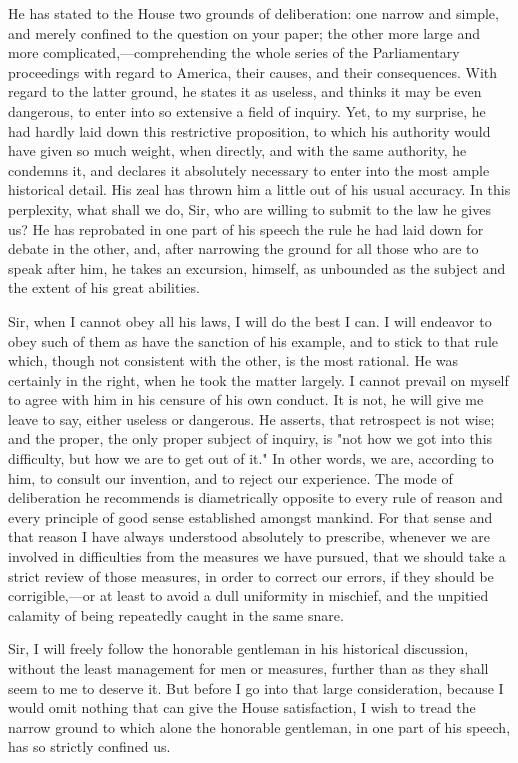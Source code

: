 He has stated to the House two grounds of deliberation: one narrow and simple, and merely confined to the question on your paper; the other more large and more complicated,—comprehending the whole series of the Parliamentary proceedings with regard to America, their causes, and their consequences. With regard to the latter ground, he states it as useless, and thinks it may be even dangerous, to enter into so extensive a field of inquiry. Yet, to my surprise, he had hardly laid down this restrictive proposition, to which his authority would have given so much weight, when directly, and with the same authority, he condemns it, and declares it absolutely necessary to enter into the most ample historical detail. His zeal has thrown him a little out of his usual accuracy. In this perplexity, what shall we do, Sir, who are willing to submit to the law he gives us? He has reprobated in one part of his speech the rule he had laid down for debate in the other, and, after narrowing the ground for all those who are to speak after him, he takes an excursion, himself, as unbounded as the subject and the extent of his great abilities.

Sir, when I cannot obey all his laws, I will do the best I can. I will endeavor to obey such of them as have the sanction of his example, and to stick to that rule which, though not consistent with the other, is the most rational. He was certainly in the right, when he took the matter largely. I cannot prevail on myself to agree with him in his censure of his own conduct. It is not, he will give me leave to say, either useless or dangerous. He asserts, that retrospect is not wise; and the proper, the only proper subject of inquiry, is "not how we got into this difficulty, but how we are to get out of it." In other words, we are, according to him, to consult our invention, and to reject our experience. The mode of deliberation he recommends is diametrically opposite to every rule of reason and every principle of good sense established amongst mankind. For that sense and that reason I have always understood absolutely to prescribe, whenever we are involved in difficulties from the measures we have pursued, that we should take a strict review of those measures, in order to correct our errors, if they should be corrigible,—or at least to avoid a dull uniformity in mischief, and the unpitied calamity of being repeatedly caught in the same snare.

Sir, I will freely follow the honorable gentleman in his historical discussion, without the least management for men or measures, further than as they shall seem to me to deserve it. But before I go into that large consideration, because I would omit nothing that can give the House satisfaction, I wish to tread the narrow ground to which alone the honorable gentleman, in one part of his speech, has so strictly confined us.


